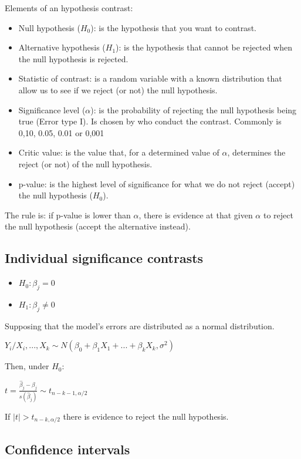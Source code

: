 \documentclass[10pt,landscape]{article}
\begin{document}
\begin{multicols}{3}
Elements of an hypothesis contrast:

\begin{itemize}
\item Null hypothesis ($H_0$): is the hypothesis that you want to contrast.
\item Alternative hypothesis ($H_1$): is the hypothesis that cannot be rejected when the null hypothesis is rejected.
\item Statistic of contrast: is a random variable with a known distribution that allow us to see if we reject (or not) the null hypothesis.
\item Significance level ($\alpha$): is the probability of rejecting the null hypothesis being true (Error type I). Is chosen by who conduct the contrast. Commonly is 0,10, 0.05, 0.01 or 0,001
\item Critic value: is the value that, for a determined value of $\alpha$, determines the reject (or not) of the null hypothesis.
\item p-value: is the highest level of significance for what we do not reject (accept) the null hypothesis ($H_0$).
\end{itemize}

The rule is: if p-value is lower than $\alpha$, there is evidence at that given $\alpha$ to reject the null hypothesis (accept the alternative instead).

\subsection*{Individual significance contrasts}

\begin{itemize}
\item $H_0: \beta_j = 0$
\item $H_1: \beta_j \neq 0$
\end{itemize}

Supposing that the model's errors are distributed as a normal distribution.

$Y_i / X_i, ..., X_k \sim N(\beta_0 + \beta_1 X_1 + ... + \beta_k X_k, \sigma^2)$

Then, under $H_0$:

$t = \frac{\hat{\beta}_j - \beta_j}{s(\hat{\beta}_j)} \sim t_{n-k-1, \alpha/2}$

If $\mid t \mid > t_{n-k, \alpha/2}$ there is evidence to reject the null hypothesis.

\subsection*{Confidence intervals}


\end{multicols}
\end{document}
